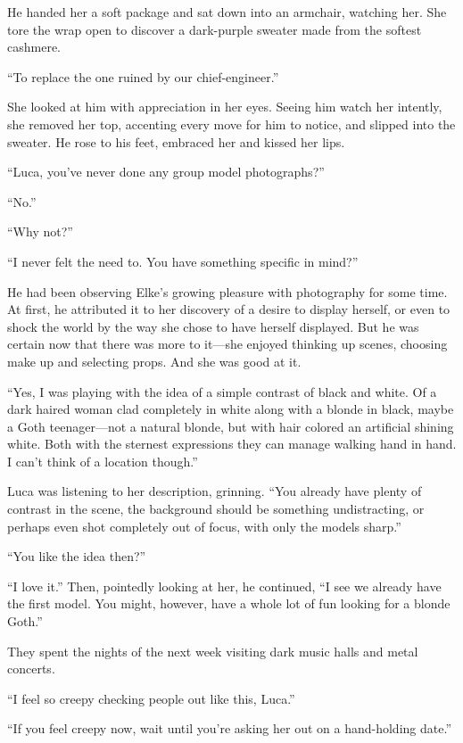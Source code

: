 He handed her a soft package and sat down into an armchair, watching her. She tore the wrap open to discover a dark-purple sweater made from the softest cashmere.

``To replace the one ruined by our chief-engineer.''

She looked at him with appreciation in her eyes. Seeing him watch her intently, she removed her top, accenting every move for him to notice, and slipped into the sweater. He rose to his feet, embraced her and kissed her lips.

``Luca, you've never done any group model photographs?''

``No.''

``Why not?''

``I never felt the need to. You have something specific in mind?''

He had been observing Elke's growing pleasure with photography for some time. At first, he attributed it to her discovery of a desire to display herself, or even to shock the world by the way she chose to have herself displayed. But he was certain now that there was more to it---she enjoyed thinking up scenes, choosing make up and selecting props. And she was good at it.

``Yes, I was playing with the idea of a simple contrast of black and white. Of a dark haired woman clad completely in white along with a blonde in black, maybe a Goth teenager---not a natural blonde, but with hair colored an artificial shining white. Both with the sternest expressions they can manage walking hand in hand. I can't think of a location though.''

Luca was listening to her description, grinning. ``You already have plenty of contrast in the scene, the background should be something undistracting, or perhaps even shot completely out of focus, with only the models sharp.''

``You like the idea then?''

``I love it.'' Then, pointedly looking at her, he continued, ``I see we already have the first model. You might, however, have a whole lot of fun looking for a blonde Goth.''

\sectionline

They spent the nights of the next week visiting dark music halls and metal concerts.

``I feel so creepy checking people out like this, Luca.''

``If you feel creepy now, wait until you're asking her out on a hand-holding date.''

